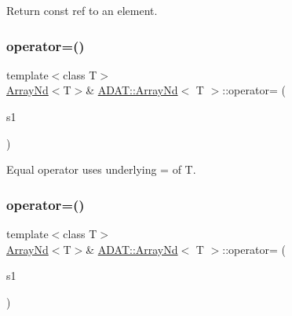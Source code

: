 Return const ref to an element. 

\mbox{\label{classADAT_1_1ArrayNd_ae3c6bdf408c630fc44a7c6dcdac94ae1}} 
\subsubsection{\texorpdfstring{operator=()}{operator=()}\hspace{0.1cm}{\footnotesize\ttfamily [1/10]}}
{\footnotesize\ttfamily template$<$class T$>$ \\
\mbox{\hyperlink{classADAT_1_1ArrayNd}{Array\+Nd}}$<$T$>$\& \mbox{\hyperlink{classADAT_1_1ArrayNd}{A\+D\+A\+T\+::\+Array\+Nd}}$<$ T $>$\+::operator= (\begin{DoxyParamCaption}\item[{const \mbox{\hyperlink{classADAT_1_1ArrayNd}{Array\+Nd}}$<$ T $>$ \&}]{s1 }\end{DoxyParamCaption})\hspace{0.3cm}{\ttfamily [inline]}}



Equal operator uses underlying = of T. 

\mbox{\label{classADAT_1_1ArrayNd_ae3c6bdf408c630fc44a7c6dcdac94ae1}} 
\subsubsection{\texorpdfstring{operator=()}{operator=()}\hspace{0.1cm}{\footnotesize\ttfamily [2/10]}}
{\footnotesize\ttfamily template$<$class T$>$ \\
\mbox{\hyperlink{classADAT_1_1ArrayNd}{Array\+Nd}}$<$T$>$\& \mbox{\hyperlink{classADAT_1_1ArrayNd}{A\+D\+A\+T\+::\+Array\+Nd}}$<$ T $>$\+::operator= (\begin{DoxyParamCaption}\item[{const \mbox{\hyperlink{classADAT_1_1ArrayNd}{Array\+Nd}}$<$ T $>$ \&}]{s1 }\end{DoxyParamCaption})\hspace{0.3cm}{\ttfamily [inline]}}



